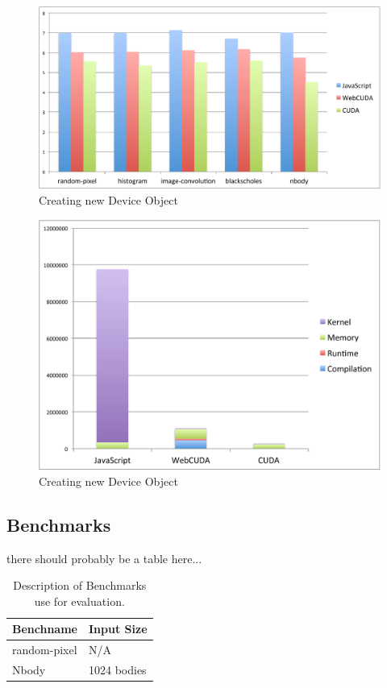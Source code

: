 
\begin{figure}
	\begin{center}
		\includegraphics[width=\columnwidth]{./figures/fig1}
	\end{center}
	\caption{Creating new \name Device Object}
	\label{v8codea}
\end{figure}

\begin{figure}
	\begin{center}
		\includegraphics[width=\columnwidth]{./figures/fig2}
	\end{center}
	\caption{Creating new \name Device Object}
	\label{v8codea}
\end{figure}

\subsection{Benchmarks}
there should probably be a table here...
\begin{table}
	\begin{center}
		\begin{tabular}{| l | l |}
			\hline
			Benchname & Input Size \\
			\hline
			random-pixel & N/A \\
			\hline
			Nbody &  1024 bodies \\
			\hline
		\end{tabular}
	\end{center}
	\caption{Description of Benchmarks use for evaluation.}
	\label{benchmark-table}
\end{table}

